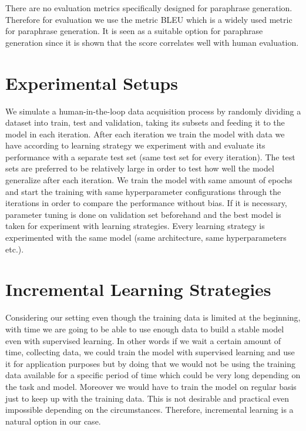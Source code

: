 There are no evaluation metrics specifically designed for paraphrase generation. Therefore for evaluation we use the metric BLEU \cite{Papinenietal} which is a widely used metric for paraphrase generation. It is seen as a suitable option for paraphrase generation since it is shown that the score correlates well with human evaluation.

\section{Experimental Setups}

We simulate a human-in-the-loop data acquisition process by randomly dividing a dataset into train, test and validation, taking its subsets and feeding it to the model in each iteration. After each iteration we train the model with data we have according to learning strategy we experiment with and evaluate its performance with a separate test set (same test set for every iteration). The test sets are preferred to be relatively large in order to test how well the model generalize after each iteration. We train the model with same amount of epochs and start the training with same hyperparameter configurations through the iterations in order to compare the performance without bias. If it is necessary, parameter tuning is done on validation set beforehand and the best model is taken for experiment with learning strategies. Every learning strategy is experimented with the same model (same architecture, same hyperparameters etc.).

\section{Incremental Learning Strategies}

Considering our setting even though the training data is limited at the beginning, with time we are going to be able to use enough data to build a stable model even with supervised learning. In other words if we wait a certain amount of time, collecting data, we could train the model with supervised learning and use it for application purposes but by doing that we would not be using the training data available for a specific period of time which could be very long depending on the task and model. Moreover we would have to train the model on regular basis just to keep up with the training data. This is not desirable and practical even impossible depending on the circumstances. Therefore, incremental learning is a natural option in our case.

